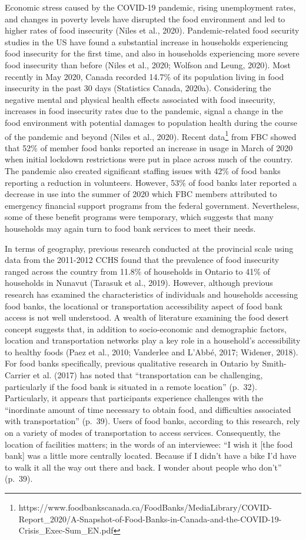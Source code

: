 \documentclass[]{elsarticle} %
\begin{document}
Economic stress caused by the COVID-19 pandemic, rising unemployment
rates, and changes in poverty levels have disrupted the food environment
and led to higher rates of food insecurity (Niles et al., 2020).
Pandemic-related food security studies in the US have found a
substantial increase in households experiencing food insecurity for the
first time, and also in households experiencing more severe food
insecurity than before (Niles et al., 2020; Wolfson and Leung, 2020).
Most recently in May 2020, Canada recorded 14.7\% of its population
living in food insecurity in the past 30 days (Statistics Canada,
2020a). Considering the negative mental and physical health effects
associated with food insecurity, increases in food insecurity rates due
to the pandemic, signal a change in the food environment with potential
damages to population health during the course of the pandemic and
beyond (Niles et al., 2020). Recent data\footnote{https://www.foodbankscanada.ca/FoodBanks/MediaLibrary/COVID-Report\_2020/A-Snapshot-of-Food-Banks-in-Canada-and-the-COVID-19-Crisis\_Exec-Sum\_EN.pdf}
from FBC showed that 52\% of member food banks reported an increase in
usage in March of 2020 when initial lockdown restrictions were put in
place across much of the country. The pandemic also created significant
staffing issues with 42\% of food banks reporting a reduction in
volunteers. However, 53\% of food banks later reported a decrease in use
into the summer of 2020 which FBC members attributed to emergency
financial support programs from the federal government. Nevertheless,
some of these benefit programs were temporary, which suggests that many
households may again turn to food bank services to meet their needs.

In terms of geography, previous research conducted at the provincial
scale using data from the 2011-2012 CCHS found that the prevalence of
food insecurity ranged across the country from 11.8\% of households in
Ontario to 41\% of households in Nunavut (Tarasuk et al., 2019).
However, although previous research has examined the characteristics of
individuals and households accessing food banks, the locational or
transportation accessibility aspect of food bank access is not well
understood. A wealth of literature examining the food desert concept
suggests that, in addition to socio-economic and demographic factors,
location and transportation networks play a key role in a household's
accessibility to healthy foods (Paez et al., 2010; Vanderlee and L'Abbé,
2017; Widener, 2018). For food banks specifically, previous qualitative
research in Ontario by Smith-Carrier et al. (2017) has noted that
``transportation can be challenging, particularly if the food bank is
situated in a remote location'' (p.~32). Particularly, it appears that
participants experience challenges with the ``inordinate amount of time
necessary to obtain food, and difficulties associated with
transportation'' (p.~39). Users of food banks, according to this
research, rely on a variety of modes of transportation to access
services. Consequently, the location of facilities matters; in the words
of an interviewee: ``I wish it {[}the food bank{]} was a little more
centrally located. Because if I didn't have a bike I'd have to walk it
all the way out there and back. I wonder about people who don't''
(p.~39).
\end{document}
